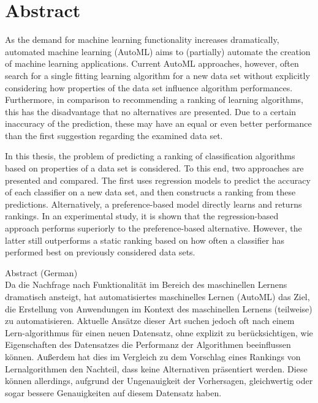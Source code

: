 \chapter*{Abstract}
\label{sec:abstract}
\vspace*{-10mm}

As the demand for machine learning functionality increases dramatically, automated machine learning (AutoML) aims to (partially) automate the creation of machine learning applications. Current AutoML approaches, however, often search for a single fitting learning algorithm for a new data set without explicitly considering how properties of the data set influence algorithm performances. Furthermore, in comparison to recommending a ranking of learning algorithms, this has the disadvantage that no alternatives are presented. Due to a certain inaccuracy of the prediction, these may have an equal or even better performance than the first suggestion regarding the examined data set.

In this thesis, the problem of predicting a ranking of classification algorithms based on properties of a data set is considered. To this end, two approaches are presented and compared. The first uses regression models to predict the accuracy of each classifier on a new data set, and then constructs a ranking from these predictions. Alternatively, a preference-based model directly learns and returns rankings. In an experimental study, it is shown that the regression-based approach performs superiorly to the preference-based alternative. However, the latter still outperforms a static ranking based on how often a classifier has performed best on previously considered data sets.

\vspace*{20mm}
\newpage

{Abstract (German)}\label{sec:abstract-german} \\

Da die Nachfrage nach Funktionalität im Bereich des maschinellen Lernens dramatisch ansteigt, hat automatisiertes maschinelles Lernen (AutoML) das Ziel, die Erstellung von Anwendungen im Kontext des maschinellen Lernens (teilweise) zu automatisieren. Aktuelle Ansätze dieser Art suchen jedoch oft nach einem Lern-algorithmus für einen neuen Datensatz, ohne explizit zu berücksichtigen, wie Eigenschaften des Datensatzes die Performanz der Algorithmen beeinflussen können. Außerdem hat dies im Vergleich zu dem Vorschlag eines Rankings von Lernalgorithmen den Nachteil, dass keine Alternativen präsentiert werden. Diese können allerdings, aufgrund der Ungenauigkeit der Vorhersagen, gleichwertig oder sogar bessere Genauigkeiten auf diesem Datensatz haben.

